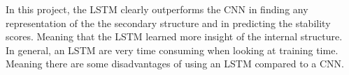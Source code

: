 In this project, the LSTM clearly outperforms the CNN in finding any representation of the the secondary structure and in predicting the stability scores. Meaning that the LSTM learned more insight of the internal structure. \\

\noindent
In general, an LSTM are very time consuming when looking at training time. Meaning there are some disadvantages of using an LSTM compared to a CNN.